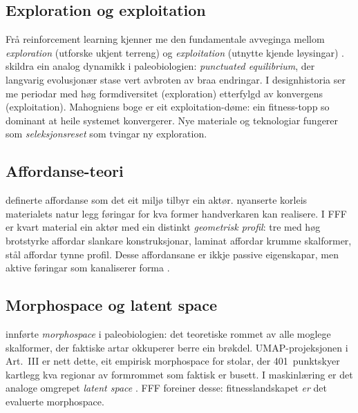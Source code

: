 \documentclass[12pt,a4paper]{article}
\begin{document}
\subsection{Exploration og exploitation}

Fr\aa{} reinforcement learning kjenner me den fundamentale avveginga mellom \emph{exploration} (utforske ukjent terreng) og \emph{exploitation} (utnytte kjende l\o{}ysingar) \citep{sutton2018}. \citet{gould1972} skildra ein analog dynamikk i paleobiologien: \emph{punctuated equilibrium}, der langvarig evolusjon\ae{}r stase vert avbroten av braa endringar. I designhistoria ser me periodar med h\o{}g formdiversitet (exploration) etterfylgd av konvergens (exploitation). Mahogniens boge \citep{finne2026a} er eit exploitation-d\o{}me: ein fitness-topp so dominant at heile systemet konvergerer. Nye materiale og teknologiar fungerer som \emph{seleksjonsreset} som tvingar ny exploration.

\subsection{Affordanse-teori}

\citet{gibson1977} definerte affordanse som det eit milj\o{} tilbyr ein akt\o{}r. \citet{pye1968} nyanserte korleis materialets natur legg f\o{}ringar for kva former handverkaren kan realisere. I FFF er kvart material ein akt\o{}r med ein distinkt \emph{geometrisk profil}: tre med h\o{}g brotstyrke affordar slankare konstruksjonar, laminat affordar krumme skalformer, st\aa{}l affordar tynne profil. Desse affordansane er ikkje passive eigenskapar, men aktive f\o{}ringar som kanaliserer forma \citep{ingold2007}.

\subsection{Morphospace og latent space}

\citet{raup1966} innf\o{}rte \emph{morphospace} i paleobiologien: det teoretiske rommet av alle moglege skalformer, der faktiske artar okkuperer berre ein br\o{}kdel. UMAP-projek\-sjonen i Art.~III \citep{finne2026c} er nett dette, eit empirisk morphospace for stolar, der 401~punktskyer kartlegg kva regionar av formrommet som faktisk er busett. I maskinl\ae{}ring er det analoge omgrepet \emph{latent space} \citep{mcinnes2018}. FFF foreiner desse: fitnesslandskapet \emph{er} det evaluerte morphospace.
\end{document}
